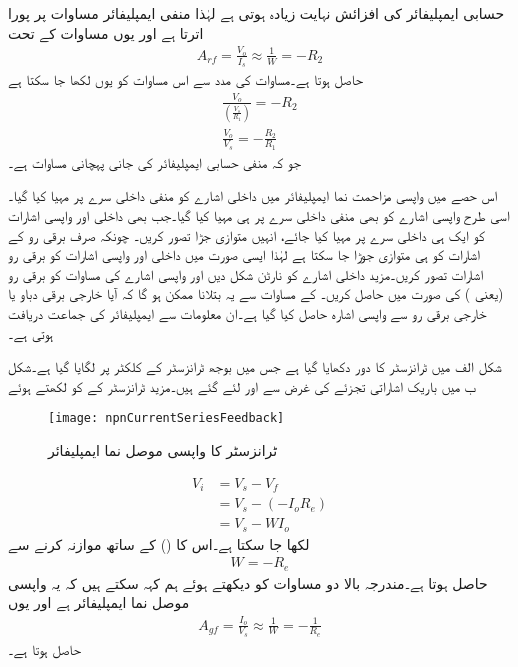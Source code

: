 حسابی ایمپلیفائر کی افزائش نہایت زیادہ ہوتی ہے لہٰذا منفی ایمپلیفائر مساوات   پر پورا اترتا ہے اور یوں مساوات  کے تحت
\begin{align}
A_{rf}=\frac{V_o}{I_s} \approx \frac{1}{W}=-R_2
\end{align}
حاصل ہوتا ہے۔مساوات  کی مدد سے اس مساوات کو یوں لکھا جا سکتا ہے
\begin{align}
\frac{V_o}{\left(\frac{V_s}{R_1} \right)}=-R_2\\
\frac{V_o}{V_s}=-\frac{R_2}{R_1}
\end{align}
جو کہ منفی حسابی ایمپلیفائر کی جانی پہچانی مساوات ہے۔

اس حصے میں واپسی مزاحمت نما ایمپلیفائر میں داخلی اشارے  کو منفی داخلی سرے پر مہیا کیا گیا۔اسی طرح واپسی اشارے کو بھی منفی داخلی سرے پر ہی مہیا کیا گیا۔جب بھی داخلی اور واپسی اشارات کو ایک ہی داخلی سرے پر مہیا کیا جائے، انہیں متوازی جڑا تصور کریں۔ چونکہ صرف برقی رو کے اشارات کو ہی متوازی جوڑا جا سکتا ہے لہٰذا ایسی صورت میں داخلی اور واپسی اشارات کو برقی رو اشارات تصور کریں۔مزید داخلی اشارے کو نارٹن شکل دیں اور واپسی اشارے کی مساوات کو برقی رو (یعنی ) کی صورت میں حاصل کریں۔ کے مساوات سے یہ بتلانا ممکن ہو گا کہ آیا خارجی برقی دباو یا خارجی برقی رو سے واپسی اشارہ حاصل کیا گیا ہے۔ان معلومات سے ایمپلیفائر کی جماعت دریافت ہوتی ہے۔

شکل  الف میں ٹرانزسٹر کا دور دکھایا گیا ہے جس میں بوجھ  ٹرانزسٹر کے کلکٹر پر لگایا گیا ہے۔شکل  ب میں باریک اشاراتی تجزئے کی غرض سے  اور  لئے گئے ہیں۔مزید ٹرانزسٹر کے  کو  لکھتے ہوئے
\begin{figure}
\centering
\texttt{[image: npnCurrentSeriesFeedback]}
\caption{ٹرانزسٹر کا واپسی موصل نما ایمپلیفائر}
\label{شکل_واپسی_ٹرانزسٹر_موصلیت_نما_ایمپلیفائر}
\end{figure}
%
\begin{align*}
V_i&=V_s-V_f \\
&=V_s-(-I_o R_e) \\
&=V_s-W I_o
\end{align*}
لکھا جا سکتا ہے۔اس کا  () کے ساتھ موازنہ کرنے سے
\begin{align}
W=-R_e 
\end{align}
حاصل ہوتا ہے۔مندرجہ بالا دو مساوات کو دیکھتے ہوئے ہم کہہ سکتے ہیں کہ یہ واپسی موصل نما ایمپلیفائر ہے اور یوں 
\begin{align}\label{مساوات_واپسی_ٹرانزسٹر_واپسی_موصلیت_نما_افزائش}
A_{gf} =\frac{I_o}{V_s}\approx \frac{1}{W}=-\frac{1}{R_e}
\end{align}
حاصل ہوتا ہے۔

